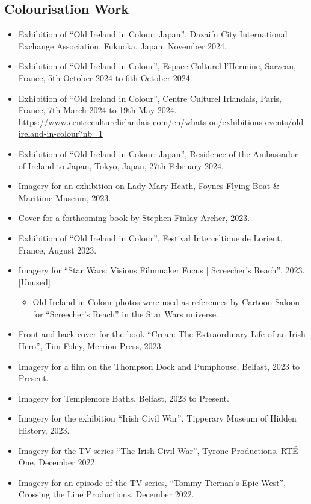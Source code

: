 \documentclass[10pt,a4paper]{res} %
\begin{document}
\begin{resume}
\subsection*{Colourisation Work}

\begin{itemize} \itemsep -2pt
\item Exhibition of ``Old Ireland in Colour: Japan'', Dazaifu City International Exchange Association, Fukuoka, Japan, November 2024.
\item Exhibition of ``Old Ireland in Colour'', Espace Culturel l'Hermine, Sarzeau, France, 5th October 2024 to 6th October 2024.
\item Exhibition of ``Old Ireland in Colour'', Centre Culturel Irlandais, Paris, France, 7th March 2024 to 19th May 2024. \url{https://www.centreculturelirlandais.com/en/whats-on/exhibitions-events/old-ireland-in-colour?nb=1}
\item Exhibition of ``Old Ireland in Colour: Japan'', Residence of the Ambassador of Ireland to Japan, Tokyo, Japan, 27th February 2024.
\item Imagery for an exhibition on Lady Mary Heath, Foynes Flying Boat \& Maritime Museum, 2023.
\item Cover for a forthcoming book by Stephen Finlay Archer, 2023.
\item Exhibition of ``Old Ireland in Colour'', Festival Interceltique de Lorient, France, August 2023.
\item Imagery for ``Star Wars: Visions Filmmaker Focus | Screecher's Reach'', 2023. [Unused]
\begin{itemize} \itemsep -2pt
\item Old Ireland in Colour photos were used as references by Cartoon Saloon for ``Screecher's Reach'' in the Star Wars universe.
\end{itemize}
\item Front and back cover for the book ``Crean: The Extraordinary Life of an Irish Hero'', Tim Foley, Merrion Press, 2023.
\item Imagery for a film on the Thompson Dock and Pumphouse, Belfast, 2023 to Present.
\item Imagery for Templemore Baths, Belfast, 2023 to Present.
\item Imagery for the exhibition ``Irish Civil War'', Tipperary Museum of Hidden History, 2023.
\item Imagery for the TV series ``The Irish Civil War'', Tyrone Productions, RT\'{E} One, December 2022.
\item Imagery for an episode of the TV series, ``Tommy Tiernan's Epic West'', Crossing the Line Productions, December 2022.

\end{itemize}
\end{resume}
\end{document}
